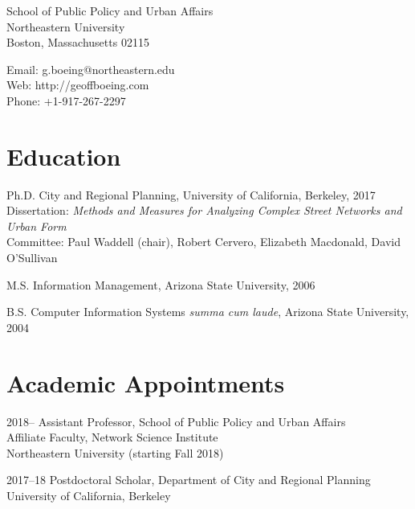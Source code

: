 \documentclass{academiccv}
\begin{document}
\raggedright

\namefont{\myname}

\vspace{1em}
\begin{minipage}[t]{0.495\textwidth}
  School of Public Policy and Urban Affairs \\
  Northeastern University \\
  Boston, Massachusetts 02115
\end{minipage}
\begin{minipage}[t]{0.495\textwidth}
  Email: g.boeing@northeastern.edu \\
  Web: http://geoffboeing.com \\
  Phone: +1-917-267-2297
\end{minipage}
\vspace{0.5em}



\section*{Education}

\begin{tablist}
	
\item[Ph.D.] \tab City and Regional Planning, University of California, Berkeley, 2017 \\
                  Dissertation: \textit{Methods and Measures for Analyzing Complex Street Networks and Urban Form} \\
                  Committee: Paul Waddell (chair), Robert Cervero, Elizabeth Macdonald, David O'Sullivan
                  
\item[M.S.]  \tab Information Management, Arizona State University, 2006

\item[B.S.]  \tab Computer Information Systems \textit{summa cum laude}, Arizona State University, 2004

\end{tablist}



\section*{Academic Appointments}

\begin{tablist}                     

\item[2018--]   \tab Assistant Professor, School of Public Policy and Urban Affairs \\
		        Affiliate Faculty, Network Science Institute \\
			    Northeastern University (starting Fall 2018)

\item[2017--18] \tab Postdoctoral Scholar, Department of City and Regional Planning \\
                University of California, Berkeley

\end{tablist}
\end{document}
